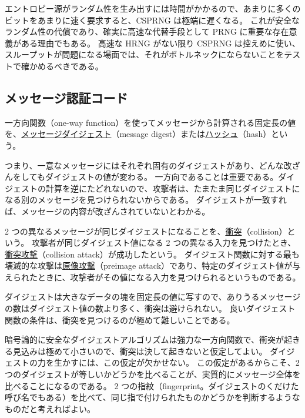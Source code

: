 \documentclass[uplatex]{jsarticle}
\def\label#1{}%
\begin{document}
\begin{rem}\label{rem:ch5-csprng-speed}
エントロピー源がランダム性を生み出すには時間がかかるので、あまりに多くのビットをあまりに速く要求すると、CSPRNG は極端に遅くなる。
これが安全なランダム性の代償であり、確実に高速な代替手段として PRNG に重要な存在意義がある理由でもある。
高速な HRNG がない限り CSPRNG は控えめに使い、スループットが問題になる場面では、それがボトルネックにならないことをテストで確かめるべきである。
\end{rem}

\subsection{メッセージ認証コード}

\begin{dfn}[メッセージダイジェスト]\label{dfn:ch5-message-digest}
一方向関数（one-way function）を使ってメッセージから計算される固定長の値を、\underline{メッセージダイジェスト}（message digest）または\underline{ハッシュ}（hash）という。
\end{dfn}

つまり、一意なメッセージにはそれぞれ固有のダイジェストがあり、どんな改ざんをしてもダイジェストの値が変わる。
一方向であることは重要である。ダイジェストの計算を逆にたどれないので、攻撃者は、たまたま同じダイジェストになる別のメッセージを見つけられないからである。
ダイジェストが一致すれば、メッセージの内容が改ざんされていないとわかる。

\begin{dfn}\label{dfn:ch5-collision}
2 つの異なるメッセージが同じダイジェストになることを、\underline{衝突}（collision）という。
攻撃者が同じダイジェスト値になる 2 つの異なる入力を見つけたとき、\underline{衝突攻撃}（collision attack）が成功したという。
ダイジェスト関数に対する最も壊滅的な攻撃は\underline{原像攻撃}（preimage attack）であり、特定のダイジェスト値が与えられたときに、攻撃者がその値になる入力を見つけられるというものである。
\end{dfn}

ダイジェストは大きなデータの塊を固定長の値に写すので、ありうるメッセージの数はダイジェスト値の数より多く、衝突は避けられない。
良いダイジェスト関数の条件は、衝突を見つけるのが極めて難しいことである。

暗号論的に安全なダイジェストアルゴリズムは強力な一方向関数で、衝突が起きる見込みは極めて小さいので、衝突は決して起きないと仮定してよい。
ダイジェストの力を生かすには、この仮定が欠かせない。
この仮定があるからこそ、2 つのダイジェストが等しいかどうかを比べることが、実質的にメッセージ全体を比べることになるのである。
2 つの指紋（fingerprint。ダイジェストのくだけた呼び名でもある）を比べて、同じ指で付けられたものかどうかを判断するようなものだと考えればよい。
\end{document}

